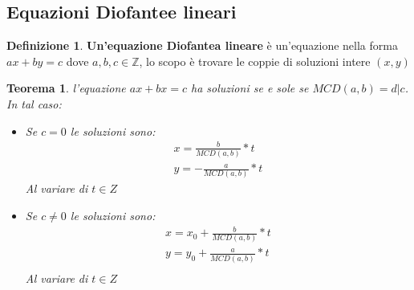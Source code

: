 \documentclass{article}
\newtheorem{theorem}{Teorema}[section]
\theoremstyle{definition}
\newtheorem{definition}{Definizione}[section]
\begin{document}
\subsection{Equazioni Diofantee lineari}\label{sec:equazione_diofantea_lineare}
\begin{definition}
        \textbf{Un'equazione Diofantea lineare} è un'equazione nella forma $ ax + by = c  $ dove $ a,b,c \in \mathbb{Z} $, lo scopo è trovare le coppie di soluzioni intere $ (x,y) $    
\end{definition}

\begin{tcolorbox}
\begin{theorem}
        l'equazione $ ax + bx = c $ ha soluzioni se e sole se $ MCD(a,b) = d | c $.                  
        In tal caso:
        \begin{itemize}
                \item Se $ c=0 $ le soluzioni sono:
                        \begin{align*}
                                x = \frac{b}{MCD(a,b)}*t \\
                                y = -\frac{a}{MCD(a,b)}*t 
                        \end{align*}
                        Al variare di $ t \in Z $
                \item Se $ c \not = 0 $ le soluzioni sono:
                        \begin{align*}
                                x = x_0 + \frac{b}{MCD(a,b)} * t \\
                                y = y_0 + \frac{a}{MCD(a,b)} * t \\
                        \end{align*}
                        Al variare di $ t \in Z $
        \end{itemize}
\end{theorem}
\end{tcolorbox}
\end{document}
